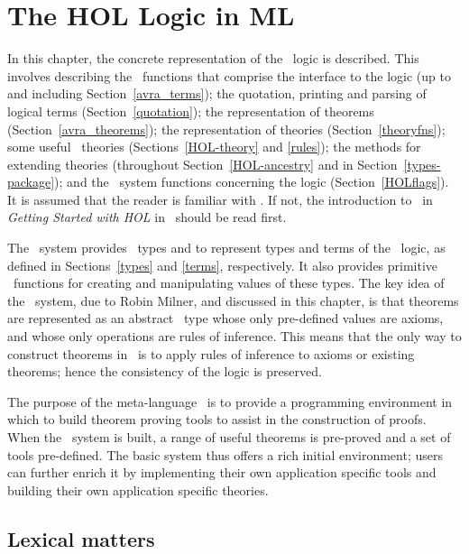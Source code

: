 \chapter{The HOL Logic in ML}\label{HOLsyschapter}

In this chapter, the concrete representation of the \HOL\ logic is
described.  This involves describing the \ML\ functions that comprise
the interface to the logic (up to and including
Section~\ref{avra_terms}); the quotation, printing and parsing of
logical terms (Section~\ref{quotation}); the representation of theorems
(Section~\ref{avra_theorems}); the representation of theories
(Section~\ref{theoryfns}); some useful \HOL\ theories
(Sections~\ref{HOL-theory} and \ref{rules}); the methods for extending
theories (throughout Section~\ref{HOL-ancestry} and in
Section~\ref{types-package}); and the \ML\ system functions concerning
the logic (Section~\ref{HOLflags}).  It is assumed that the reader is
familiar with \ML.  If not, the introduction to \ML\ in {\sl Getting
Started with HOL\/} in \TUTORIAL\ should be read first.

The \HOL\ system provides \ML\ types  and  to represent
types and terms of the \HOL\ logic, as defined in Sections~\ref{types} and
\ref{terms}, respectively. It also provides primitive \ML\ functions for
creating and manipulating values of these types.  The key idea of the \HOL\
system, due to Robin Milner, and discussed in this chapter,
is that theorems are represented as an abstract \ML\ type whose only
pre-defined values are axioms, and whose only operations are rules of
inference. This means that the only way to construct theorems in \HOL\ is
to apply rules of inference to axioms or existing theorems; hence the
consistency of the logic is preserved.

The purpose of the meta-language \ML\ is to provide a programming
environment in which to build theorem proving tools to assist in the
construction of proofs.  When the \HOL\ system is built, a range of
useful theorems is pre-proved and a set of tools pre-defined. The basic
system thus offers a rich initial environment; users can further enrich
it by implementing their own application specific tools and building
their own application specific theories.


\section{Lexical matters}
\label{HOL-lex}

